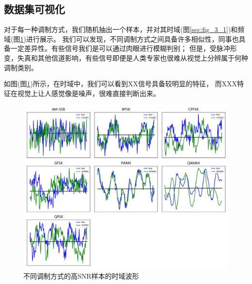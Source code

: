 \subsection{数据集可视化}

对于每一种调制方式，我们随机抽出一个样本，并对其时域(图\ref{sec:fig_3_1})和频域(图\ref{sec:fig_3_2})进行展示。
我们可以发现，不同调制方式之间具备许多相似性，同事也具备一定差异性。有些信号我们是可以通过肉眼进行模糊判别；
但是，受脉冲形变，失真和其他信道影响，有些信号即便是人类专家也很难从视觉上分辨属于何种调制类别。\par

如图(图\ref{sec:fig_3_2})所示，在时域中，我们可以看到XX信号具备较明显的特征，
而XXX特征在视觉上让人感觉像是噪声，很难直接判断出来。\par

\begin{figure}[!h]
	\centering
	\includegraphics[scale=0.45]{figures/chapter_3/fig_3_2}
	\caption{不同调制方式的高SNR样本的时域波形}\label{sec:fig_3_2}
\end{figure}

